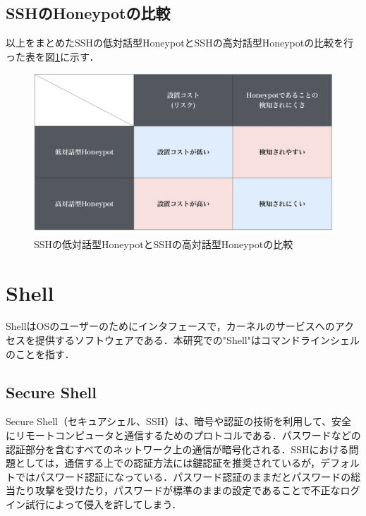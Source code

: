 \subsection{SSHのHoneypotの比較}
\label{tech:CompareHoneypot}
以上をまとめたSSHの低対話型HoneypotとSSHの高対話型Honeypotの比較を行った表を図\ref{fig:compare}に示す．

\vspace{10mm}
\begin{figure}[htbp]
    \centering
    \includegraphics[width=1.0\textwidth]{figures/compare.png}
    \caption{SSHの低対話型HoneypotとSSHの高対話型Honeypotの比較}
    \label{fig:compare}
\end{figure}


\section{Shell}
\label{tech:Shell}
ShellはOSのユーザーのためにインタフェースで，カーネルのサービスへのアクセスを提供するソフトウェアである．本研究での"Shell"はコマンドラインシェルのことを指す．

\subsection{Secure Shell}
\label{tech:Secure Shell}
Secure Shell（セキュアシェル、SSH）は、暗号や認証の技術を利用して、安全にリモートコンピュータと通信するためのプロトコルである．パスワードなどの認証部分を含むすべてのネットワーク上の通信が暗号化される．\cite{ssh}SSHにおける問題としては，通信する上での認証方法には鍵認証を推奨されているが，デフォルトではパスワード認証になっている．パスワード認証のままだとパスワードの総当たり攻撃を受けたり，パスワードが標準のままの設定であることで不正なログイン試行によって侵入を許してしまう．

